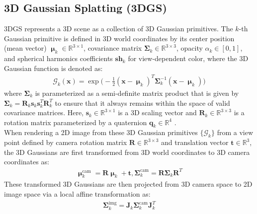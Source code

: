 \documentclass[runningheads]{llncs}
\begin{document}
\subsection{3D Gaussian Splatting (3DGS)}
3DGS \cite{kerbl20233d} represents a 3D scene as a collection of 3D Gaussian primitives. The $k$-th Gaussian primitive is defined in 3D world coordinates by its center position (mean vector) $\bm{\upmu}_k\in\mathbb{R}^{3\times1}$, covariance matrix $\mathbf{\Sigma}_k\in\mathbb{R}^{3\times3}$, opacity $\alpha_k\in[0, 1]$, and spherical harmonics coefficients $\mathbf{sh}_k$ for view-dependent color, where the 3D Gaussian function is denoted as:
\begin{equation}
  \begin{split}
  \mathcal{G}_k(\mathbf{x})=\exp\bigg(-\frac{1}{2}(\mathbf{x}-\bm{\upmu}_k)^T\mathbf{\Sigma}_k^{-1}(\mathbf{x}-\bm{\upmu}_k)\bigg)
  \end{split}
  \label{eq:gs_primitive}
\end{equation}
where $\mathbf{\Sigma}_k$ is parameterized as a semi-definite matrix product that is given by $\mathbf{\Sigma}_k=\mathbf{R}_k\mathbf{s}_k\mathbf{s}_k^T\mathbf{R}_k^T$ to ensure that it always remains within the space of valid covariance matrices. Here, $\mathbf{s}_k\in\mathbb{R}^{3\times1}$ is a 3D scaling vector and $\mathbf{R}_k\in\mathbb{R}^{3\times3}$ is a rotation matrix parameterized by a quaternion $\mathbf{q}_k\in\mathbb{R}^4$ \cite{kerbl20233d}.\\
When rendering a 2D image from these 3D Gaussian primitives $\{\mathcal{G}_k\}$ from a view point defined by camera rotation matrix $\mathbf{R}\in\mathbb{R}^{3\times3}$ and translation vector $\mathbf{t}\in\mathbb{R}^{3}$, the 3D Gaussians are first transformed from 3D world coordinates to 3D camera coordinates as:
\begin{equation}
  \begin{split}
  \bm{\upmu}_k^\text{cam}=\mathbf{R}\bm{\upmu}_k+\mathbf{t}, \mathbf{\Sigma}_k^\text{cam}=\mathbf{R}\mathbf{\Sigma}_k\mathbf{R}^T
  \end{split}
  \label{eq:gs_world_to_camera}
\end{equation}
These transformed 3D Gaussians are then projected from 3D camera space to 2D image space via a local affine transformation as:
\begin{equation}
  \begin{split}
  \mathbf{\Sigma}_k^\text{img}=\mathbf{J}_k\mathbf{\Sigma}_k^\text{cam}\mathbf{J}_k^T
  \end{split}
  \label{eq:gs_camera_to_image}
\end{equation}
\end{document}

